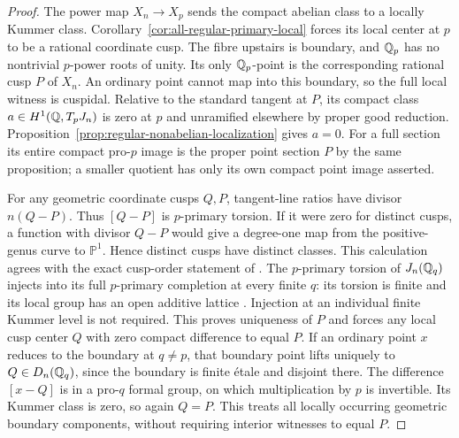 \begin{proof}
The power map $X_n\to X_p$ sends the compact abelian class to a
locally Kummer class. Corollary~\ref{cor:all-regular-primary-local} forces its local center at
$p$ to be a rational coordinate cusp. The fibre upstairs is boundary,
and $\mathbb Q_p$ has no nontrivial $p$-power roots of unity. Its only
$\mathbb Q_p$-point is the corresponding rational cusp $P$ of $X_n$.
An ordinary point cannot map into this boundary, so the full local
witness is cuspidal. Relative to the standard tangent at $P$, its
compact class $a\in H^1(\mathbb Q,T_pJ_n)$ is zero at $p$ and unramified
elsewhere by proper good reduction.
Proposition~\ref{prop:regular-nonabelian-localization} gives $a=0$.
For a full section its entire compact pro-$p$ image is the proper
point section $P$ by the same proposition; a smaller quotient
has only its own compact point image asserted.

For any geometric coordinate cusps $Q,P$, tangent-line ratios
have divisor $n(Q-P)$. Thus $[Q-P]$ is $p$-primary torsion. If it
were zero for distinct cusps, a function with divisor $Q-P$ would
give a degree-one map from the positive-genus curve to $\mathbb P^1$.
Hence distinct cusps have distinct classes. This calculation agrees
with the exact cusp-order statement of
\citet[p.~191, before Theorem~A]{Coleman1986}.
The $p$-primary torsion of $J_n(\mathbb Q_q)$ injects into its full
$p$-primary completion at every finite $q$: its torsion is finite
and its local group has an open additive lattice
\citep[I.3.3, p.~41]{Milne2006ADT}. Injection at an individual
finite Kummer level is not required. This proves uniqueness of
$P$ and forces any local cusp center $Q$ with zero compact
difference to equal $P$. If an ordinary point $x$ reduces to the
boundary at $q\ne p$, that boundary point lifts uniquely to
$Q\in D_n(\mathbb Q_q)$, since the boundary is finite \'etale and disjoint
there. The difference $[x-Q]$ is in a pro-$q$ formal group, on
which multiplication by $p$ is invertible. Its Kummer class is zero,
so again $Q=P$. This treats all locally occurring geometric
boundary components, without requiring interior witnesses to equal $P$.
\end{proof}

